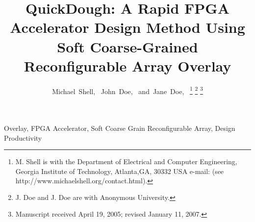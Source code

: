 \documentclass[journal]{IEEEtran}
\begin{document}
\title{QuickDough: A Rapid FPGA Accelerator Design Method Using Soft Coarse-Grained Reconfigurable Array Overlay}
\author{Michael~Shell,~
John~Doe,~
and~Jane~Doe,~%
\thanks{M. Shell is with the Department of Electrical and Computer Engineering, Georgia Institute of Technology, Atlanta,GA, 30332 USA e-mail: (see http://www.michaelshell.org/contact.html).} %
\thanks{J. Doe and J. Doe are with Anonymous University.}%
\thanks{Manuscript received April 19, 2005; revised January 11, 2007.}
}
\maketitle

\begin{abstract}
    
\end{abstract}

\begin{IEEEkeywords}
    Overlay, FPGA Accelerator, Soft Coarse Grain Reconfigurable Array, Design Productivity
\end{IEEEkeywords}











\end{document}
